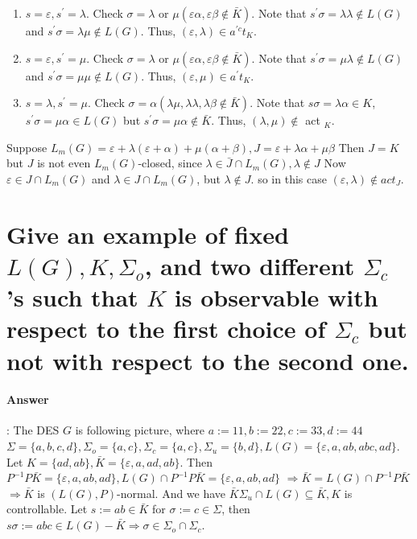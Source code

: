 \documentclass{article}
\begin{document}
\begin{enumerate}
  \item  $s=\varepsilon, s^{\prime}=\lambda$. Check $\sigma=\lambda$ or $\mu(\varepsilon \alpha, \varepsilon \beta \notin \bar{K})$. Note that $s^{\prime} \sigma=\lambda \lambda \notin L(G)$ and $s^{\prime} \sigma=\lambda \mu \notin L(G)$. Thus, $(\varepsilon, \lambda) \in a^{\prime c} t_K$.
  \item $s=\varepsilon, s^{\prime}=\mu$. Check $\sigma=\lambda$ or $\mu(\varepsilon \alpha, \varepsilon \beta \notin \bar{K})$. Note that $s^{\prime} \sigma=\mu \lambda \notin L(G)$ and $s^{\prime} \sigma=\mu \mu \notin L(G)$. Thus, $(\varepsilon, \mu) \in a^{\prime} t_K$.
  \item $s=\lambda, s^{\prime}=\mu$. Check $\sigma=\alpha(\lambda \mu, \lambda \lambda, \lambda \beta \notin \bar{K})$. Note that $s \sigma=\lambda \alpha \in K$, $s^{\prime} \sigma=\mu \alpha \in L(G)$ but $s^{\prime} \sigma=\mu \alpha \notin \bar{K}$. Thus, $(\lambda, \mu) \notin$ act ${ }_K$.
\end{enumerate}

Suppose $L_m(G)=\varepsilon+\lambda(\varepsilon+\alpha)+\mu(\alpha+\beta), J=\varepsilon+\lambda \alpha+\mu \beta$ Then $J=K$ but $J$ is not even $L_m(G)$-closed, since $\lambda \in \bar{J} \cap L_m(G), \lambda \notin J$ Now $\varepsilon \in J \cap L_m(G)$ and $\lambda \in J \cap L_m(G)$, but $\lambda \notin J$. so in this case $(\varepsilon, \lambda) \notin a c t_J$.

\section{Give an example of fixed $L(G), K, \Sigma_o$, and two different $\Sigma_c$ 's such that $K$ is observable with respect to the first choice of $\Sigma_c$ but not with respect to the second one.}

\paragraph{Answer}:
The DES $G$ is following picture, where $a:=11, b:=22, c:=33, d:=44$ $\Sigma=\{a, b, c, d\}, \Sigma_o=\{a, c\}, \Sigma_c=\{a, c\}, \Sigma_u=\{b, d\}, L(G)=\{\varepsilon, a, a b, a b c, a d\}$. Let $K=\{a d, a b\}, \bar{K}=\{\varepsilon, a, a d, a b\}$.
Then $P^{-1} P \bar{K}=\{\varepsilon, a, a b, a d\}, L(G) \cap P^{-1} P \bar{K}=\{\varepsilon, a, a b, a d\}$
$\Longrightarrow \bar{K}=L(G) \cap P^{-1} P \bar{K}$
$\Longrightarrow \bar{K}$ is $(L(G), P)$-normal.
And we have $\bar{K} \Sigma_u \cap L(G) \subseteq \bar{K}, K$ is controllable. Let $s:=a b \in \bar{K}$ for $\sigma:=c \in \Sigma$, then $s \sigma:=a b c \in L(G)-\bar{K} \Longrightarrow \sigma \in \Sigma_o \cap \Sigma_c$.
\end{document}
